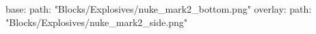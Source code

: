 base:
  path: "Blocks/Explosives/nuke_mark2_bottom.png"
overlay:
  path: "Blocks/Explosives/nuke_mark2_side.png"